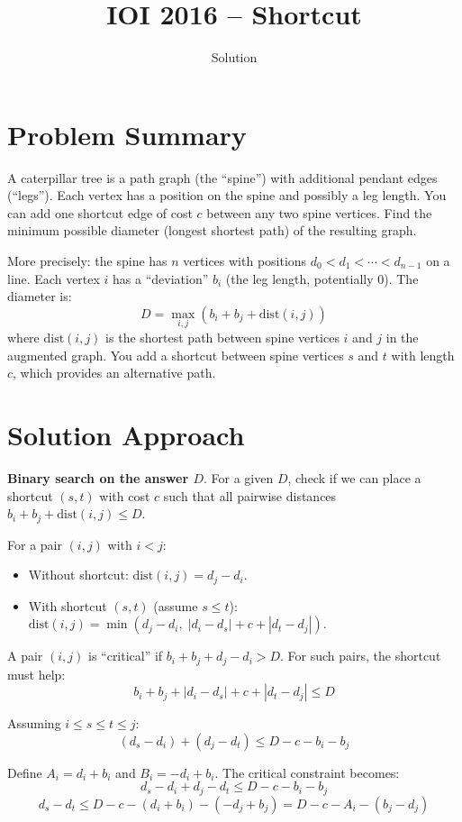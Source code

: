 \documentclass[11pt,a4paper]{article}
\title{IOI 2016 -- Shortcut}
\author{Solution}
\date{}
\begin{document}
\maketitle

\section{Problem Summary}

A caterpillar tree is a path graph (the ``spine'') with additional pendant edges (``legs''). Each vertex has a position on the spine and possibly a leg length. You can add one shortcut edge of cost $c$ between any two spine vertices. Find the minimum possible diameter (longest shortest path) of the resulting graph.

More precisely: the spine has $n$ vertices with positions $d_0 < d_1 < \cdots < d_{n-1}$ on a line. Each vertex $i$ has a ``deviation'' $b_i$ (the leg length, potentially 0). The diameter is:
\[
  D = \max_{i, j} \left( b_i + b_j + \text{dist}(i, j) \right)
\]
where $\text{dist}(i, j)$ is the shortest path between spine vertices $i$ and $j$ in the augmented graph. You add a shortcut between spine vertices $s$ and $t$ with length $c$, which provides an alternative path.

\section{Solution Approach}

\textbf{Binary search on the answer $D$}. For a given $D$, check if we can place a shortcut $(s, t)$ with cost $c$ such that all pairwise distances $b_i + b_j + \text{dist}(i, j) \le D$.

For a pair $(i, j)$ with $i < j$:
\begin{itemize}
  \item Without shortcut: $\text{dist}(i, j) = d_j - d_i$.
  \item With shortcut $(s, t)$ (assume $s \le t$): $\text{dist}(i, j) = \min(d_j - d_i, \; |d_i - d_s| + c + |d_t - d_j|)$.
\end{itemize}

A pair $(i, j)$ is ``critical'' if $b_i + b_j + d_j - d_i > D$. For such pairs, the shortcut must help:
\[
  b_i + b_j + |d_i - d_s| + c + |d_t - d_j| \le D
\]

Assuming $i \le s \le t \le j$:
\[
  (d_s - d_i) + (d_j - d_t) \le D - c - b_i - b_j
\]

Define $A_i = d_i + b_i$ and $B_i = -d_i + b_i$. The critical constraint becomes:
\[
  d_s - d_i + d_j - d_t \le D - c - b_i - b_j
\]
\[
  d_s - d_t \le D - c - (d_i + b_i) - (-d_j + b_j) = D - c - A_i - (b_j - d_j)
\]
\end{document}
